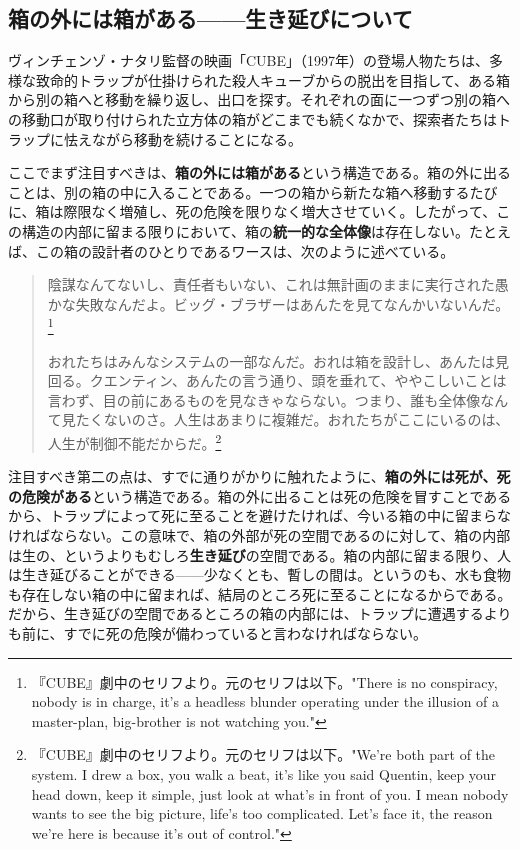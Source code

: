 \documentclass[9pt,b5j,twoside,twocolumn]{utarticle}
\begin{document}
\subsection{\tbaselineshift =3.0pt 箱の外には箱がある------生き延びについて}

ヴィンチェンゾ・ナタリ監督の映画「CUBE」（1997年）の登場人物たちは、多様な致命的トラップが仕掛けられた殺人キューブからの脱出を目指して、ある箱から別の箱へと移動を繰り返し、出口を探す。それぞれの面に一つずつ別の箱への移動口が取り付けられた立方体の箱がどこまでも続くなかで、探索者たちはトラップに怯えながら移動を続けることになる。

ここでまず注目すべきは、\textbf{箱の外には箱がある}という構造である。箱の外に出ることは、別の箱の中に入ることである。一つの箱から新たな箱へ移動するたびに、箱は際限なく増殖し、死の危険を限りなく増大させていく。したがって、この構造の内部に留まる限りにおいて、箱の\textbf{統一的な全体像}は存在しない。たとえば、この箱の設計者のひとりであるワースは、次のように述べている。

\begin{quotation}
陰謀なんてないし、責任者もいない、これは無計画のままに実行された愚かな失敗なんだよ。ビッグ・ブラザーはあんたを見てなんかいないんだ。\footnote{『CUBE』劇中のセリフより。元のセリフは以下。"There is no conspiracy, nobody is in charge, it's a headless blunder operating under the illusion of a master-plan, big-brother is not watching you."}

おれたちはみんなシステムの一部なんだ。おれは箱を設計し、あんたは見回る。クエンティン、あんたの言う通り、頭を垂れて、ややこしいことは言わず、目の前にあるものを見なきゃならない。つまり、誰も全体像なんて見たくないのさ。人生はあまりに複雑だ。おれたちがここにいるのは、人生が制御不能だからだ。\footnote{『CUBE』劇中のセリフより。元のセリフは以下。"We're both part of the system. I drew a box, you walk a beat, it's like you said Quentin, keep your head down, keep it simple, just look at what's in front of you. I mean nobody wants to see the big picture, life's too complicated. Let's face it, the reason we're here is because it's out of control."}
\end{quotation}

注目すべき第二の点は、すでに通りがかりに触れたように、\textbf{箱の外には死が、死の危険がある}という構造である。箱の外に出ることは死の危険を冒すことであるから、トラップによって死に至ることを避けたければ、今いる箱の中に留まらなければならない。この意味で、箱の外部が死の空間であるのに対して、箱の内部は生の、というよりもむしろ\textbf{生き延び}の空間である。箱の内部に留まる限り、人は生き延びることができる------少なくとも、暫しの間は。というのも、水も食物も存在しない箱の中に留まれば、結局のところ死に至ることになるからである。だから、生き延びの空間であるところの箱の内部には、トラップに遭遇するよりも前に、すでに死の危険が備わっていると言わなければならない。
\end{document}
